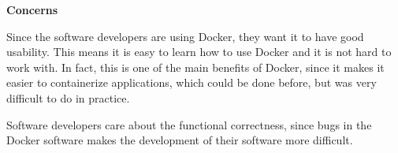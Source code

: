 \textbf{Concerns}
\begin{description}[labelwidth=6cm,labelindent=30pt,style=multiline,leftmargin=5.5cm,font=\normalfont\itshape]




\item[\textbf{Usability}] Since the software developers are using Docker, they want it to have good usability. This means it is easy to learn how to use Docker and it is not hard to work with. In fact, this is one of the main benefits of Docker, since it makes it easier to containerize applications, which could be done before, but was very difficult to do in practice.


\item[\textbf{Functional Suitability} (Functional correctness)] Software developers care about the functional correctness, since bugs in the Docker software makes the development of their software more difficult. 

\end{description}

